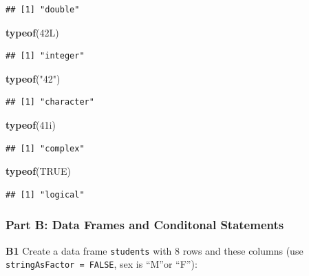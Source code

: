 \documentclass[
]{article}
\newenvironment{Shaded}{\begin{snugshade}}{\end{snugshade}}
\newcommand{\ConstantTok}[1]{\textcolor[rgb]{0.56,0.35,0.01}{#1}}
\newcommand{\DataTypeTok}[1]{\textcolor[rgb]{0.13,0.29,0.53}{#1}}
\newcommand{\DecValTok}[1]{\textcolor[rgb]{0.00,0.00,0.81}{#1}}
\newcommand{\FunctionTok}[1]{\textcolor[rgb]{0.13,0.29,0.53}{\textbf{#1}}}
\newcommand{\NormalTok}[1]{#1}
\newcommand{\StringTok}[1]{\textcolor[rgb]{0.31,0.60,0.02}{#1}}
\begin{document}
\begin{verbatim}
## [1] "double"
\end{verbatim}

\begin{Shaded}
\begin{Highlighting}[]
\FunctionTok{typeof}\NormalTok{(}\DecValTok{42}\DataTypeTok{L}\NormalTok{)}
\end{Highlighting}
\end{Shaded}

\begin{verbatim}
## [1] "integer"
\end{verbatim}

\begin{Shaded}
\begin{Highlighting}[]
\FunctionTok{typeof}\NormalTok{(}\StringTok{"42"}\NormalTok{)}
\end{Highlighting}
\end{Shaded}

\begin{verbatim}
## [1] "character"
\end{verbatim}

\begin{Shaded}
\begin{Highlighting}[]
\FunctionTok{typeof}\NormalTok{(}\DecValTok{41}\DataTypeTok{i}\NormalTok{)}
\end{Highlighting}
\end{Shaded}

\begin{verbatim}
## [1] "complex"
\end{verbatim}

\begin{Shaded}
\begin{Highlighting}[]
\FunctionTok{typeof}\NormalTok{(}\ConstantTok{TRUE}\NormalTok{)}
\end{Highlighting}
\end{Shaded}

\begin{verbatim}
## [1] "logical"
\end{verbatim}

\subsubsection{Part B: Data Frames and Conditonal
Statements}\label{part-b-data-frames-and-conditonal-statements}

\textbf{B1} Create a data frame \texttt{students} with 8 rows and these
columns (use \texttt{stringAsFactor\ =\ FALSE}, sex is ``M''or ``F''):
\end{document}
